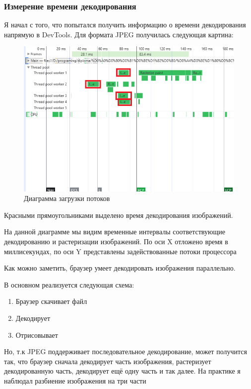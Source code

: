 \documentclass[12pt]{article}
\begin{document}
\subsubsection{Измерение времени декодирования}

Я начал с того, что попытался получить информацию о времени декодирования напрямую
в DevTools. Для формата JPEG получилась следующая картина:

\begin{figure}[H]
    \centering
    \includegraphics[width=1\textwidth]{../images/image_comp/devtools.png}
    \caption{Диаграмма загрузки потоков}
\end{figure}

Красными прямоугольниками выделено время декодирования изображений.

На данной диаграмме мы видим временные интервалы соответствующие декодированию и растеризации изображений.
По оси X отложено время в миллисекундах, по оси Y представлены задействованные потоки процессора

Как можно заметить, браузер умеет декодировать изображения параллельно.

В основном реализуется следующая схема:

\begin{enumerate}
    \item Браузер скачивает файл
    \item Декодирует
    \item Отрисовывает
\end{enumerate}

Но, т.к JPEG поддерживает последовательное декодирование,
может получится так, что браузер сначала декодирует часть изображения,
растеризует декодированную часть, декодирует ещё одну часть и так далее.
На практике я наблюдал разбиение изображения на три части
\end{document}
